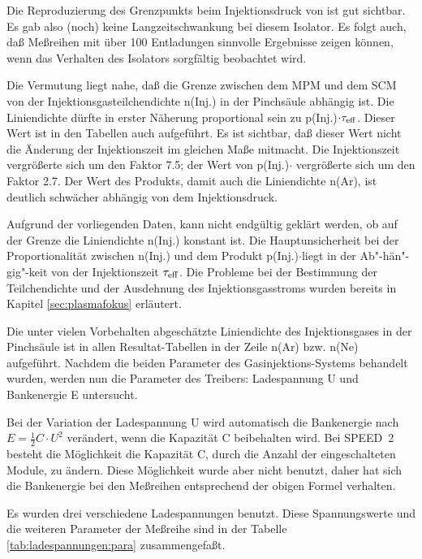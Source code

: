 %
\par
Die Reproduzierung des Grenzpunkts beim Injektionsdruck von
 ist gut sichtbar. Es gab also (noch) keine
Langzeitschwankung bei diesem Isolator. Es folgt auch, daß
Meßreihen mit über 100 Entladungen sinnvolle Ergebnisse zeigen
können, wenn das Verhalten des Isolators sorgfältig beobachtet
wird.
\par
Die Vermutung liegt nahe, daß die Grenze zwischen dem MPM und dem SCM
von der Injektionsgasteilchendichte n(Inj.) in der Pinchsäule abhängig
ist. Die Liniendichte dürfte in erster Näherung proportional sein zu
p(Inj.)$\cdot \tau_{\rm eff}$. Dieser Wert ist in den Tabellen auch
aufgeführt. Es ist sichtbar, daß dieser Wert nicht die Änderung der
Injektionszeit im gleichen Maße mitmacht. Die Injektionszeit
vergrößerte sich um den Faktor 7.5; der Wert von p(Inj.)$\cdot$\teff
vergrößerte sich um den Faktor 2.7. Der Wert des Produkts, damit auch
die Liniendichte n(Ar), ist deutlich schwächer abhängig von dem
Injektionsdruck.
\par
Aufgrund der vorliegenden Daten, kann nicht endgültig geklärt
werden, ob auf der Grenze die Liniendichte n(Inj.) konstant ist.
Die Hauptunsicherheit bei der Proportionalität zwischen n(Inj.)
und dem Produkt p(Inj.)$\cdot$\teff liegt in der
Ab"-hän"-gig"-keit von der Injektionszeit $\tau_{\rm eff}$. Die
Probleme bei der Bestimmung der Teilchendichte und der Ausdehnung
des Injektionsgasstroms wurden bereits in Kapitel
\vref{sec:plasmafokus} erläutert.
\par
Die unter vielen Vorbehalten abgeschätzte Liniendichte des
Injektionsgases in der Pinchsäule ist in allen Resultat-Tabellen in der
Zeile n(Ar) bzw. n(Ne) aufgeführt.
%
\label{sec:grenze:ladespannungen}
%
Nachdem die beiden Parameter des Gasinjektions-Systems behandelt
wurden, werden nun die Parameter des Treibers: Ladespannung U und
Bankenergie E untersucht.
\par
Bei der Variation der Ladespannung U wird automatisch die Bankenergie
nach $ E = \frac{1}{2} C \cdot U^2 $ verändert, wenn die Kapazität C
beibehalten wird. Bei SPEED~2 besteht die Möglichkeit die Kapazität C,
durch die Anzahl der eingeschalteten Module, zu ändern. Diese
Möglichkeit wurde aber nicht benutzt, daher hat sich die Bankenergie
bei den Meßreihen entsprechend der obigen Formel verhalten.
\par
Es wurden drei verschiedene Ladespannungen benutzt. Diese
Spannungswerte und die weiteren Parameter der Meßreihe sind in der
Tabelle \vref{tab:ladespannungen:para} zusammengefaßt.
